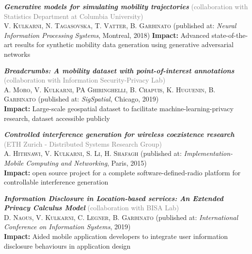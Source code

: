 
\begin{itemize}[leftmargin=*]

    \small{

    \item \textbf{\textit{Generative models for simulating mobility trajectories}} \textcolor{gray}{(collaboration with Statistics Department at Columbia University)}\\
    \textsc{V. Kulkarni, N. Tagasovska, T. Vatter, B. Garbinato} (published at: \textit{Neural Information Processing Systems}, Montreal, 2018)
    \textbf{Impact:} Advanced state-of-the-art results for synthetic mobility data generation using generative adversarial networks 
    
    
    \item \textbf{\textit{Breadcrumbs: A mobility dataset with point-of-interest annotations}} \textcolor{gray}{(collaboration with Information Security-Privacy  Lab)}\\
    \textsc{A. Moro, V. Kulkarni, PA Ghiringhelli, B. Chapuis, K. Huguenin, B. Garbinato} (published at: \textit{SigSpatial}, Chicago, 2019)\\
    \textbf{Impact:} Large-scale geospatial dataset to facilitate machine-learning-privacy research, dataset accessible publicly
   
   
    \item \textbf{\textit{Controlled interference generation for wireless coexistence research}} \textcolor{gray}{(ETH Zurich - Distributed Systems Research Group)}\\
    \textsc{A. Hithnawi, V. Kulkarni, S. Li, H. Shafagh} (published at: \textit{Implementation-Mobile Computing and Networking}, Paris, 2015)\\
    \textbf{Impact:} open source project for a complete software-defined-radio platform for controllable interference generation   
    

    \item \textbf{\textit{Information Disclosure in Location-based services: An Extended Privacy Calculus Model}} \textcolor{gray}{(collaboration with BISA Lab)}\\
    \textsc{D. Naous, V. Kulkarni, C. Legner, B. Garbinato} (published at: \textit{International Conference on Information Systems}, 2019)\\
    \textbf{Impact:} Aided mobile application developers to integrate user information disclosure behaviours in application design
    
}
\end{itemize}
